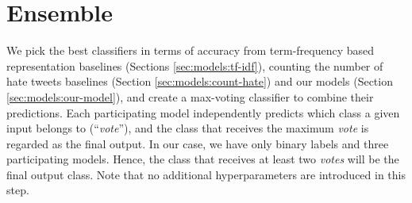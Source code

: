 




\section{Ensemble}
\label{sec:models:ensemble}

We pick the best classifiers in terms of accuracy from term-frequency based representation baselines (Sections \ref{sec:models:tf-idf}), counting the number of hate tweets baselines (Section \ref{sec:models:count-hate}) and our models (Section \ref{sec:models:our-model}), and create a max-voting classifier to combine their predictions. Each participating model independently predicts which class a given input belongs to (``\textit{vote}''), and the class that receives the maximum \textit{vote} is regarded as the final output. In our case, we have only binary labels and three participating models. Hence, the class that receives at least two \textit{votes} will be the final output class. Note that no additional hyperparameters are introduced in this step.


